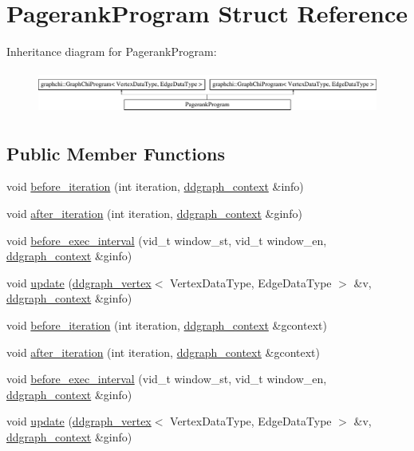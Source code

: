 \hypertarget{struct_pagerank_program}{\section{Pagerank\-Program Struct Reference}
\label{struct_pagerank_program}
}
Inheritance diagram for Pagerank\-Program\-:\begin{figure}[H]
\begin{center}
\leavevmode
\includegraphics[height=1.454545cm]{struct_pagerank_program}
\end{center}
\end{figure}
\subsection*{Public Member Functions}
\begin{DoxyCompactItemize}
\item 
void \hyperlink{struct_pagerank_program_a24985cb94a2405111cd4f06b747c9c9a}{before\-\_\-iteration} (int iteration, \hyperlink{structddgraph_1_1ddgraph__context}{ddgraph\-\_\-context} \&info)
\item 
void \hyperlink{struct_pagerank_program_a372d4640eb60ccbf512eafa0db284597}{after\-\_\-iteration} (int iteration, \hyperlink{structddgraph_1_1ddgraph__context}{ddgraph\-\_\-context} \&ginfo)
\item 
void \hyperlink{struct_pagerank_program_abc0abfe9be0c903925e02d0a50eeb3b0}{before\-\_\-exec\-\_\-interval} (vid\-\_\-t window\-\_\-st, vid\-\_\-t window\-\_\-en, \hyperlink{structddgraph_1_1ddgraph__context}{ddgraph\-\_\-context} \&ginfo)
\item 
void \hyperlink{struct_pagerank_program_a0124e454f3b242b5d29a217f3427c84b}{update} (\hyperlink{classddgraph_1_1ddgraph__vertex}{ddgraph\-\_\-vertex}$<$ Vertex\-Data\-Type, Edge\-Data\-Type $>$ \&v, \hyperlink{structddgraph_1_1ddgraph__context}{ddgraph\-\_\-context} \&ginfo)
\item 
void \hyperlink{struct_pagerank_program_a7b9dc8efce8e7c09bc83c2c3a25d1935}{before\-\_\-iteration} (int iteration, \hyperlink{structddgraph_1_1ddgraph__context}{ddgraph\-\_\-context} \&gcontext)
\item 
void \hyperlink{struct_pagerank_program_a0d99d6408cac5f713ccd6f999b14f5ab}{after\-\_\-iteration} (int iteration, \hyperlink{structddgraph_1_1ddgraph__context}{ddgraph\-\_\-context} \&gcontext)
\item 
void \hyperlink{struct_pagerank_program_abc0abfe9be0c903925e02d0a50eeb3b0}{before\-\_\-exec\-\_\-interval} (vid\-\_\-t window\-\_\-st, vid\-\_\-t window\-\_\-en, \hyperlink{structddgraph_1_1ddgraph__context}{ddgraph\-\_\-context} \&ginfo)
\item 
void \hyperlink{struct_pagerank_program_a0124e454f3b242b5d29a217f3427c84b}{update} (\hyperlink{classddgraph_1_1ddgraph__vertex}{ddgraph\-\_\-vertex}$<$ Vertex\-Data\-Type, Edge\-Data\-Type $>$ \&v, \hyperlink{structddgraph_1_1ddgraph__context}{ddgraph\-\_\-context} \&ginfo)
\end{DoxyCompactItemize}
